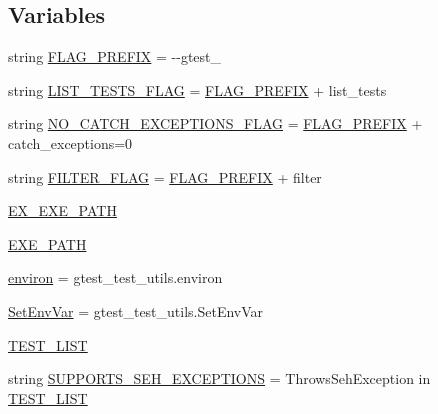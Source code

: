 \subsection*{Variables}
\begin{DoxyCompactItemize}
\item 
string \hyperlink{namespacegtest__catch__exceptions__test_a2d40f89077ec9fdb51008c263148315f}{F\+L\+A\+G\+\_\+\+P\+R\+E\+F\+IX} = \textquotesingle{}-\/-\/gtest\+\_\+\textquotesingle{}
\item 
string \hyperlink{namespacegtest__catch__exceptions__test_a68601cbcd48065a2f656eb8552784f0c}{L\+I\+S\+T\+\_\+\+T\+E\+S\+T\+S\+\_\+\+F\+L\+AG} = \hyperlink{namespacegtest__catch__exceptions__test_a2d40f89077ec9fdb51008c263148315f}{F\+L\+A\+G\+\_\+\+P\+R\+E\+F\+IX} + \textquotesingle{}list\+\_\+tests\textquotesingle{}
\item 
string \hyperlink{namespacegtest__catch__exceptions__test_af3e2719448df6b24d78c870e5b586e8b}{N\+O\+\_\+\+C\+A\+T\+C\+H\+\_\+\+E\+X\+C\+E\+P\+T\+I\+O\+N\+S\+\_\+\+F\+L\+AG} = \hyperlink{namespacegtest__catch__exceptions__test_a2d40f89077ec9fdb51008c263148315f}{F\+L\+A\+G\+\_\+\+P\+R\+E\+F\+IX} + \textquotesingle{}catch\+\_\+exceptions=0\textquotesingle{}
\item 
string \hyperlink{namespacegtest__catch__exceptions__test_a1a53cfa4c10fe3bdbc85a14fd9692751}{F\+I\+L\+T\+E\+R\+\_\+\+F\+L\+AG} = \hyperlink{namespacegtest__catch__exceptions__test_a2d40f89077ec9fdb51008c263148315f}{F\+L\+A\+G\+\_\+\+P\+R\+E\+F\+IX} + \textquotesingle{}filter\textquotesingle{}
\item 
\hyperlink{namespacegtest__catch__exceptions__test_a2154a0f0c4c506089d686c1365d288be}{E\+X\+\_\+\+E\+X\+E\+\_\+\+P\+A\+TH}
\item 
\hyperlink{namespacegtest__catch__exceptions__test_a164e7815d55b13a811ce60e2e6f9448d}{E\+X\+E\+\_\+\+P\+A\+TH}
\item 
\hyperlink{namespacegtest__catch__exceptions__test_ae51b794c28e667016c180f1b3fc85292}{environ} = gtest\+\_\+test\+\_\+utils.\+environ
\item 
\hyperlink{namespacegtest__catch__exceptions__test_a60be14c2b88aafb689ba4d3d2578449e}{Set\+Env\+Var} = gtest\+\_\+test\+\_\+utils.\+Set\+Env\+Var
\item 
\hyperlink{namespacegtest__catch__exceptions__test_ac0cf90f54624335d1765e85cf6a74e21}{T\+E\+S\+T\+\_\+\+L\+I\+ST}
\item 
string \hyperlink{namespacegtest__catch__exceptions__test_a237f68d721da53e9fd4f83b07a1887e3}{S\+U\+P\+P\+O\+R\+T\+S\+\_\+\+S\+E\+H\+\_\+\+E\+X\+C\+E\+P\+T\+I\+O\+NS} = \textquotesingle{}Throws\+Seh\+Exception\textquotesingle{} in \hyperlink{namespacegtest__catch__exceptions__test_ac0cf90f54624335d1765e85cf6a74e21}{T\+E\+S\+T\+\_\+\+L\+I\+ST}

\end{DoxyCompactItemize}
